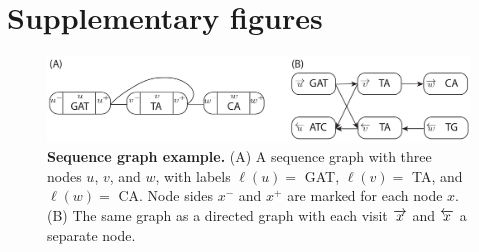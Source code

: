 \documentclass[11pt]{ucscthesis}
\newcommand{\nodelabel}[1]{\ensuremath{\ell\left( #1 \right)}}
\newcommand{\leftside}[1]{\ensuremath{{ #1 }^{-}}}
\newcommand{\rightside}[1]{\ensuremath{{ #1 }^{+}}}
\newcommand{\forwardnode}[1]{\ensuremath{\protect\overrightarrow{ #1 }}}
\newcommand{\reversenode}[1]{\ensuremath{\protect\overleftarrow{ #1 }}}
\begin{document}
\newpage

\section{Supplementary figures}

\begin{figure}[H]
    \centering
    \includegraphics[width=\linewidth]{aim2_supplement_graph_example.pdf}
    \caption[Sequence graph example]{\textbf{Sequence graph example.}
      (A) A sequence graph with three nodes $u$, $v$, and $w$, with labels $\nodelabel{u} =$ GAT, $\nodelabel{v} =$ TA, and $\nodelabel{w} =$ CA. Node sides $\leftside{x}$ and $\rightside{x}$ are marked for each node $x$.
      (B) The same graph as a directed graph with each visit $\forwardnode{x}$ and $\reversenode{x}$ a separate node.
    }
    \label{fig:aim2_supplement_graph-example}
    \label{fig:first}
\end{figure}
\end{document}
